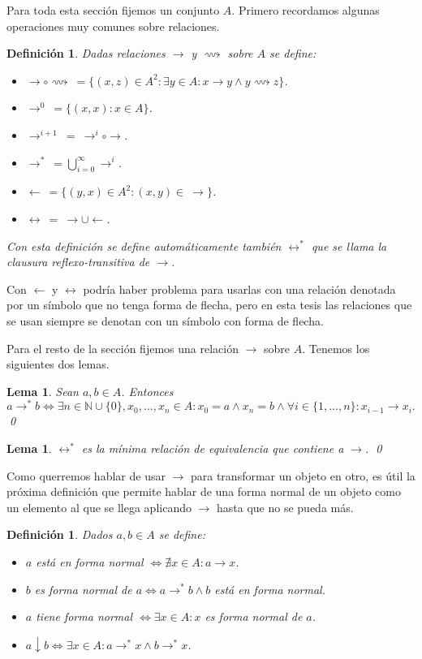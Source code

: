 \documentclass[12pt]{report}
\theoremstyle{customstyle}
\newtheorem{definition}[theorem]{Definición}
\newtheorem{lemma}[theorem]{Lema}
\theoremstyle{factstyle}
\begin{document}
Para toda esta sección fijemos un conjunto $A$. Primero recordamos algunas operaciones muy comunes sobre relaciones.

\begin{definition}\label{def:operaciones relaciones}
  Dadas relaciones $→$ y $⟿$ sobre $A$ se define:
  \begin{itemize}
    \item $→ ∘ ⟿\ = \{(x, z) ∈ A^2 : ∃y ∈ A : x → y ∧ y ⟿ z\}$.
    \item $→^0\ = \{(x, x) : x ∈ A\}$.
    \item $→^{i + 1}\ =\ →^i ∘ →$.
    \item $→^*\ = ⋃_{i = 0}^∞ →^i$.
    \item $←\ = \{(y, x) ∈ A^2 : (x, y) ∈\ →\}$.
    \item $↔\ =\ → ∪ ←$.
  \end{itemize}

  Con esta definición se define automáticamente también $↔^*$ que se llama la clausura reflexo-transitiva de $→$.
\end{definition}

Con $←$ y $↔$ podría haber problema para usarlas con una relación denotada por un símbolo que no tenga forma de flecha, pero en esta tesis las relaciones que se usan siempre se denotan con un símbolo con forma de flecha.

Para el resto de la sección fijemos una relación $→$ sobre $A$. Tenemos los siguientes dos lemas.

\begin{lemma}\label{lemma:→* como ∃}
  Sean $a, b ∈ A$. Entonces
  \[ a →^* b ⇔ ∃n ∈ ℕ ∪ \{0\}, x_0, …, x_n ∈ A : x_0 = a ∧ x_n = b ∧ ∀i ∈ \{1, …, n\} : x_{i-1} → x_i \text{.}\]
  \qed
\end{lemma}

\begin{lemma}\label{lemma:↔* min equiv que contiene a →}
  $↔^*$ es la mínima relación de equivalencia que contiene a $→$.
  \qed
\end{lemma}

Como querremos hablar de usar $→$ para transformar un objeto en otro, es útil la próxima definición que permite hablar de una forma normal de un objeto como un elemento al que se llega aplicando $→$ hasta que no se pueda más.

\begin{definition}\label{def:forma normal}
  Dados $a, b ∈ A$ se define:
  \begin{itemize}
    \item $a$ está en forma normal $⇔ ∄x ∈ A : a → x$.
    \item $b$ es forma normal de $a ⇔ a →^* b ∧ b$ está en forma normal.
    \item $a$ tiene forma normal $⇔ ∃x ∈ A : x$ es forma normal de $a$.
    \item $a ↓ b ⇔ ∃x ∈ A : a →^* x ∧ b →^* x$.
  \end{itemize}
\end{definition}
\end{document}
